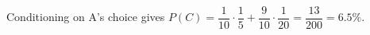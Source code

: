 Conditioning on A's choice gives $ P(C)=\dfrac{1}{10}\cdot\dfrac{1}{5}+\dfrac{9}{10}\cdot\dfrac{1}{20}=\dfrac{13}{200}=\boxed{6.5\%}$.

